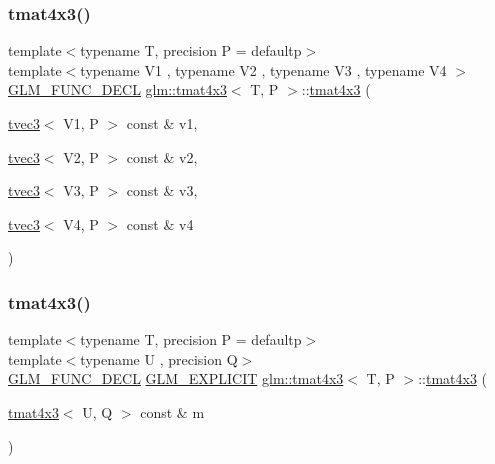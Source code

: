 \subsubsection{\texorpdfstring{tmat4x3()}{tmat4x3()}\hspace{0.1cm}{\footnotesize\ttfamily [9/22]}}
{\footnotesize\ttfamily template$<$typename T, precision P = defaultp$>$ \\
template$<$typename V1 , typename V2 , typename V3 , typename V4 $>$ \\
\mbox{\hyperlink{setup_8hpp_ab2d052de21a70539923e9bcbf6e83a51}{G\+L\+M\+\_\+\+F\+U\+N\+C\+\_\+\+D\+E\+CL}} \mbox{\hyperlink{structglm_1_1tmat4x3}{glm\+::tmat4x3}}$<$ T, P $>$\+::\mbox{\hyperlink{structglm_1_1tmat4x3}{tmat4x3}} (\begin{DoxyParamCaption}\item[{\mbox{\hyperlink{structglm_1_1tvec3}{tvec3}}$<$ V1, P $>$ const \&}]{v1,  }\item[{\mbox{\hyperlink{structglm_1_1tvec3}{tvec3}}$<$ V2, P $>$ const \&}]{v2,  }\item[{\mbox{\hyperlink{structglm_1_1tvec3}{tvec3}}$<$ V3, P $>$ const \&}]{v3,  }\item[{\mbox{\hyperlink{structglm_1_1tvec3}{tvec3}}$<$ V4, P $>$ const \&}]{v4 }\end{DoxyParamCaption})}

\mbox{\label{structglm_1_1tmat4x3_aa0103a8d29b63892bf75c1f28cccfe23}} 
\subsubsection{\texorpdfstring{tmat4x3()}{tmat4x3()}\hspace{0.1cm}{\footnotesize\ttfamily [10/22]}}
{\footnotesize\ttfamily template$<$typename T, precision P = defaultp$>$ \\
template$<$typename U , precision Q$>$ \\
\mbox{\hyperlink{setup_8hpp_ab2d052de21a70539923e9bcbf6e83a51}{G\+L\+M\+\_\+\+F\+U\+N\+C\+\_\+\+D\+E\+CL}} \mbox{\hyperlink{setup_8hpp_a6c74f5a5e7b134ab69023ff9a30d4d5d}{G\+L\+M\+\_\+\+E\+X\+P\+L\+I\+C\+IT}} \mbox{\hyperlink{structglm_1_1tmat4x3}{glm\+::tmat4x3}}$<$ T, P $>$\+::\mbox{\hyperlink{structglm_1_1tmat4x3}{tmat4x3}} (\begin{DoxyParamCaption}\item[{\mbox{\hyperlink{structglm_1_1tmat4x3}{tmat4x3}}$<$ U, Q $>$ const \&}]{m }\end{DoxyParamCaption})}

